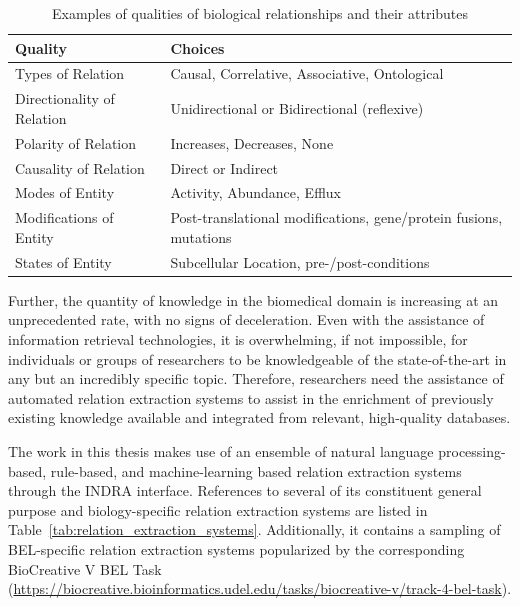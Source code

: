 \begin{table}
    \caption{Examples of qualities of biological relationships and their attributes}
    \label{tab:biological_relations}
    \centering
    \begin{tabular}{ l l }
        Quality & Choices \\
        \hline
        Types of Relation & Causal, Correlative, Associative, Ontological \\
        Directionality of Relation & Unidirectional or Bidirectional (reflexive) \\
        Polarity of Relation & Increases, Decreases, None \\
        Causality of Relation & Direct or Indirect \\
        Modes of Entity & Activity, Abundance, Efflux  \\
        Modifications of Entity & Post-translational modifications, gene/protein fusions, mutations \\
        States of Entity & Subcellular Location, pre-/post-conditions \\
    \end{tabular}
\end{table}

Further, the quantity of knowledge in the biomedical domain is increasing at an unprecedented rate, with no signs of deceleration.
Even with the assistance of information retrieval technologies, it is overwhelming, if not impossible, for individuals or groups of researchers to be knowledgeable of the state-of-the-art in any but an incredibly specific topic.
Therefore, researchers need the assistance of automated relation extraction systems to assist in the enrichment of previously existing knowledge available and integrated from relevant, high-quality databases.

The work in this thesis makes use of an ensemble of natural language processing-based, rule-based, and machine-learning based relation extraction systems through the \ac{INDRA} interface.
References to several of its constituent general purpose and biology-specific relation extraction systems are listed in Table~\ref{tab:relation_extraction_systems}.
Additionally, it contains a sampling of BEL-specific relation extraction systems popularized by the corresponding BioCreative V BEL Task (\url{https://biocreative.bioinformatics.udel.edu/tasks/biocreative-v/track-4-bel-task}).


